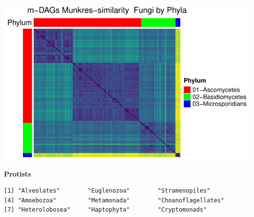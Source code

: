 \documentclass[
  letterpaper,
  DIV=11,
  numbers=noendperiod]{scrreprt}
\newenvironment{Shaded}{}{}
\newcommand{\FunctionTok}[1]{\textcolor[rgb]{0.38,0.69,0.94}{#1}}
\newcommand{\NormalTok}[1]{\textcolor[rgb]{0.67,0.70,0.75}{#1}}
\newcommand{\OtherTok}[1]{\textcolor[rgb]{0.15,0.68,0.38}{#1}}
\newcommand{\SpecialCharTok}[1]{\textcolor[rgb]{0.34,0.71,0.76}{#1}}
\newcommand{\StringTok}[1]{\textcolor[rgb]{0.60,0.76,0.47}{#1}}
\begin{document}
\includegraphics[width=1\textwidth,height=\textheight]{appendix_files/figure-pdf/unnamed-chunk-13-2.pdf}

\textbf{Protists}

\begin{Shaded}
\end{Shaded}

\begin{verbatim}
[1] "Alveolates"        "Euglenozoa"        "Stramenopiles"    
[4] "Amoebozoa"         "Metamonada"        "Choanoflagellates"
[7] "Heterolobosea"     "Haptophyta"        "Cryptomonads"     
\end{verbatim}
\end{document}
